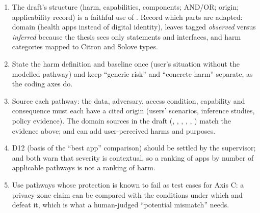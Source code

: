 \begin{thesisbox}
\begin{enumerate}[leftmargin=1.3em]
\item The draft's structure (harm, capabilities, components; AND/OR; origin; applicability record) is a faithful use of . Record which parts are adapted: domain (health apps instead of digital identity), leaves tagged \emph{observed} versus \emph{inferred} because the thesis sees only statements and interfaces, and harm categories mapped to Citron and Solove types.
\item State the harm definition and baseline once (user's situation without the modelled pathway) and keep ``generic risk'' and ``concrete harm'' separate, as the coding axes do.
\item Source each pathway: the data, adversary, access condition, capability and consequence must each have a cited origin (users' scenarios, inference studies, policy evidence). The domain sources in the draft (, , , , , ) match the evidence above;  and  can add user-perceived harms and purposes.
\item D12 (basis of the ``best app'' comparison) should be settled by the supervisor;  and  both warn that severity is contextual, so a ranking of apps by number of applicable pathways is not a ranking of harm.
\item Use pathways whose protection is known to fail as test cases for Axis C: a privacy-zone claim can be compared with the conditions under which  and  defeat it, which is what a human-judged ``potential mismatch'' needs.
\end{enumerate}
\end{thesisbox}
